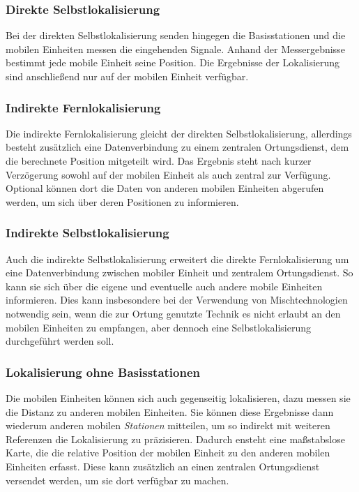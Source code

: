 \subsubsection{Direkte Selbstlokalisierung} 
Bei der direkten Selbstlokalisierung senden hingegen die Basisstationen und die mobilen Einheiten messen die eingehenden Signale. Anhand der Messergebnisse bestimmt jede mobile Einheit seine Position. 
Die Ergebnisse der Lokalisierung sind anschließend nur auf der mobilen Einheit verfügbar. 

\subsubsection{Indirekte Fernlokalisierung} 
Die indirekte Fernlokalisierung gleicht der direkten Selbstlokalisierung, allerdings besteht zusätzlich eine Datenverbindung zu einem zentralen Ortungsdienst, dem die berechnete Position mitgeteilt wird. 
Das Ergebnis steht nach kurzer Verzögerung sowohl auf der mobilen Einheit als auch zentral zur Verfügung.
Optional können dort die Daten von anderen mobilen Einheiten abgerufen werden, um sich über deren Positionen zu informieren. 

\subsubsection{Indirekte Selbstlokalisierung} 
Auch die indirekte Selbstlokalisierung erweitert die direkte Fernlokalisierung um eine Datenverbindung zwischen mobiler Einheit und zentralem Ortungsdienst. 
So kann sie sich über die eigene und eventuelle auch andere mobile Einheiten informieren. 
Dies kann insbesondere bei der Verwendung von Mischtechnologien notwendig sein, wenn die zur Ortung genutzte Technik es nicht erlaubt an den mobilen Einheiten zu empfangen, aber dennoch eine Selbstlokalisierung durchgeführt werden soll.

\subsubsection{Lokalisierung ohne Basisstationen} 
Die mobilen Einheiten können sich auch gegenseitig lokalisieren, dazu messen sie die Distanz zu anderen mobilen Einheiten.
Sie können diese Ergebnisse dann wiederum anderen mobilen \emph{Stationen} mitteilen, um so indirekt mit weiteren Referenzen die Lokalisierung zu präzisieren. 
Dadurch ensteht eine maßstabslose Karte, die die relative Position der mobilen Einheit zu den anderen mobilen Einheiten erfasst.
Diese kann zusätzlich an einen zentralen Ortungsdienst versendet werden, um sie dort verfügbar zu machen.

